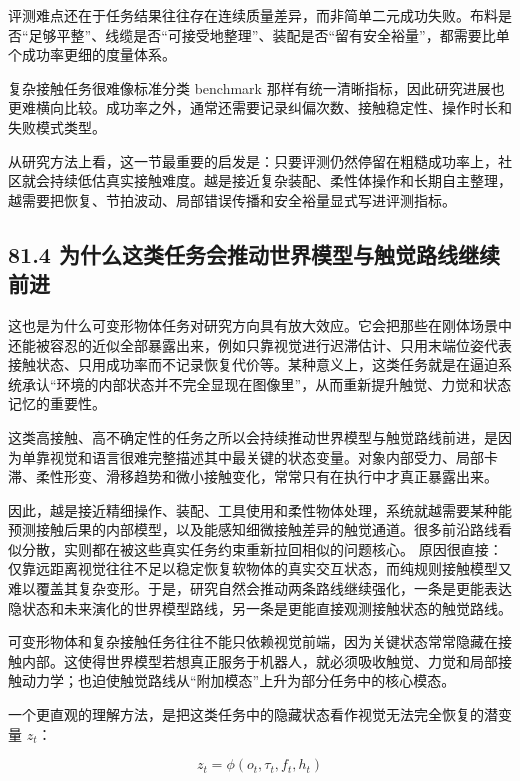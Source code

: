 评测难点还在于任务结果往往存在连续质量差异，而非简单二元成功失败。布料是否“足够平整”、线缆是否“可接受地整理”、装配是否“留有安全裕量”，都需要比单个成功率更细的度量体系。

复杂接触任务很难像标准分类 benchmark 那样有统一清晰指标，因此研究进展也更难横向比较。成功率之外，通常还需要记录纠偏次数、接触稳定性、操作时长和失败模式类型。

从研究方法上看，这一节最重要的启发是：只要评测仍然停留在粗糙成功率上，社区就会持续低估真实接触难度。越是接近复杂装配、柔性体操作和长期自主整理，越需要把恢复、节拍波动、局部错误传播和安全裕量显式写进评测指标。

\subsection*{81.4 为什么这类任务会推动世界模型与触觉路线继续前进}


这也是为什么可变形物体任务对研究方向具有放大效应。它会把那些在刚体场景中还能被容忍的近似全部暴露出来，例如只靠视觉进行迟滞估计、只用末端位姿代表接触状态、只用成功率而不记录恢复代价等。某种意义上，这类任务就是在逼迫系统承认“环境的内部状态并不完全显现在图像里”，从而重新提升触觉、力觉和状态记忆的重要性。

这类高接触、高不确定性的任务之所以会持续推动世界模型与触觉路线前进，是因为单靠视觉和语言很难完整描述其中最关键的状态变量。对象内部受力、局部卡滞、柔性形变、滑移趋势和微小接触变化，常常只有在执行中才真正暴露出来。

因此，越是接近精细操作、装配、工具使用和柔性物体处理，系统就越需要某种能预测接触后果的内部模型，以及能感知细微接触差异的触觉通道。很多前沿路线看似分散，实则都在被这些真实任务约束重新拉回相似的问题核心。 原因很直接：仅靠远距离视觉往往不足以稳定恢复软物体的真实交互状态，而纯规则接触模型又难以覆盖其复杂变形。于是，研究自然会推动两条路线继续强化，一条是更能表达隐状态和未来演化的世界模型路线，另一条是更能直接观测接触状态的触觉路线。

可变形物体和复杂接触任务往往不能只依赖视觉前端，因为关键状态常常隐藏在接触内部。这使得世界模型若想真正服务于机器人，就必须吸收触觉、力觉和局部接触动力学；也迫使触觉路线从“附加模态”上升为部分任务中的核心模态。

一个更直观的理解方法，是把这类任务中的隐藏状态看作视觉无法完全恢复的潜变量 \(z_t\)：

\begin{equation*}
z_t = \phi(o_t, \tau_t, f_t, h_t)
\end{equation*}

